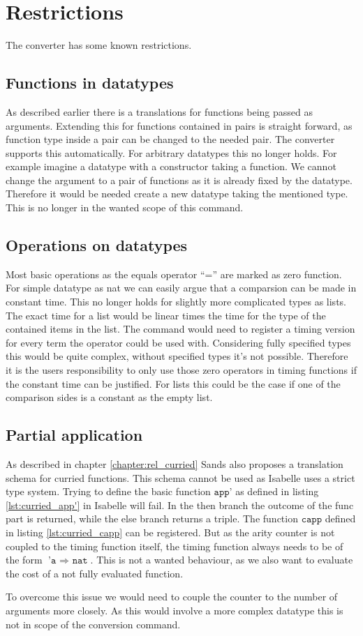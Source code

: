 
\section{Restrictions} \label{chapter:restrictions}
The converter has some known restrictions.

\subsection{Functions in datatypes}
As described earlier there is a translations for functions being passed as arguments.
Extending this for functions contained in pairs is straight forward, as function type inside a pair can be changed to the needed pair.
The converter supports this automatically.
For arbitrary datatypes this no longer holds.
For example imagine a datatype with a constructor taking a function.
We cannot change the argument to a pair of functions as it is already fixed by the datatype.
Therefore it would be needed create a new datatype taking the mentioned type.
This is no longer in the wanted scope of this command.

\subsection{Operations on datatypes} \label{chapter:nonconstant_zeros}
Most basic operations as the equals operator ``='' are marked as zero function.
For simple datatype as nat we can easily argue that a comparsion can be made in constant time.
This no longer holds for slightly more complicated types as lists.
The exact time for a list would be linear times the time for the type of the contained items in the list.
The command would need to register a timing version for every term the operator could be used with.
Considering fully specified types this would be quite complex, without specified types it's not possible.
Therefore it is the users responsibility to only use those zero operators in timing functions if the constant time can be justified.
For lists this could be the case if one of the comparison sides is a constant as the empty list.

\subsection{Partial application}
As described in chapter \ref{chapter:rel_curried} Sands also proposes a translation schema for curried functions.
This schema cannot be used as Isabelle uses a strict type system.
Trying to define the basic function $\texttt{app'}$ as defined in listing \ref{lst:curried_app'} in Isabelle will fail.
In the then branch the outcome of the func part is returned, while the else branch returns a triple.
The function $\texttt{capp}$ defined in listing \ref{lst:curried_capp} can be registered.
But as the arity counter is not coupled to the timing function itself, the timing function always needs to be of the form $\texttt{'a $\Rightarrow$ nat}$.
This is not a wanted behaviour, as we also want to evaluate the cost of a not fully evaluated function.

To overcome this issue we would need to couple the counter to the number of arguments more closely.
As this would involve a more complex datatype this is not in scope of the conversion command.
